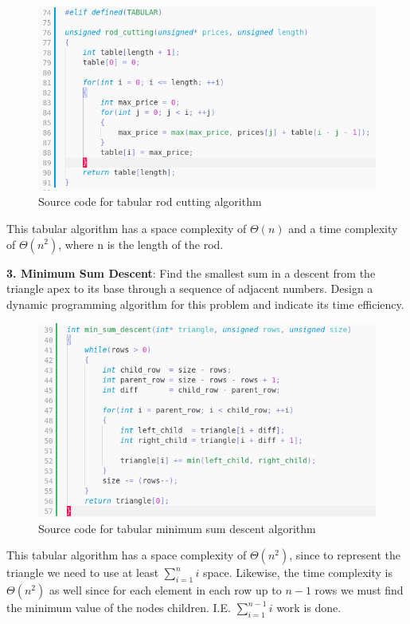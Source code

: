 \documentclass[11pt,letterpaper]{report}
\begin{document}
{  \begin{figure}[h!]
	\centering
	\includegraphics[width=1\linewidth]{rod_cutting.png}
	\caption[cs350]{Source code for tabular rod cutting algorithm}
	\label{fig:P1compileP0-1}
  \end{figure}

  This tabular algorithm has a space complexity of $\Theta(n)$ and a time 
  complexity of $\Theta(n^2)$, where n is the length of the rod. 

  \pagebreak

  \noindent\textbf{3. Minimum Sum Descent}: Find the smallest sum in 
  a descent from the triangle apex to its base through a sequence of adjacent 
  numbers. Design a dynamic programming algorithm for this problem and indicate 
  its time efficiency.

  \begin{figure}[h!]
	\centering
	\includegraphics[width=1\linewidth]{sum_descent1.png}
	\caption[cs350]{Source code for tabular minimum sum descent algorithm}
	\label{fig:P1compileP0-1}
  \end{figure}

  This tabular algorithm has a space complexity of $\Theta(n^2)$, since to represent 
  the triangle we need to use at least $\sum_{i=1}^{n}i$ space. Likewise, the time 
  complexity is $\Theta(n^2)$ as well since for each element in each row up to $n-1$ 
  rows we must find the minimum value of the nodes children. I.E. $\sum_{i=1}^{n-1}i$ 
  work is done. 

}
\end{document}
